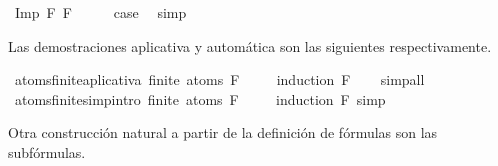 \begin{isabellebody}
\ {\isacharparenleft}Imp\ F{}\ F{}{\isacharparenright}\isanewline
\ \ \isamarkupfalse%
\ \isamarkupfalse%
\ {\isacharquery}case\ \isamarkupfalse%
\ simp\isanewline
{}\isamarkupfalse%
%
\endisatagproof
{\isafoldproof}%
%
\isadelimproof
%
\endisadelimproof
%
\begin{isamarkuptext}%
Las demostraciones aplicativa y automática son las siguientes respectivamente.%
\end{isamarkuptext}\isamarkuptrue%
\isamarkupfalse%
\ atoms{\isacharunderscore}finite{\isacharunderscore}aplicativa{\isacharcolon}\ {\isachardoublequoteopen}finite\ {\isacharparenleft}atoms\ F{\isacharparenright}{\isachardoublequoteclose}\ \isanewline
%
\isadelimproof
\ \ %
\endisadelimproof
%
\isatagproof
{}\isamarkupfalse%
\ {\isacharparenleft}induction\ F{\isacharparenright}\isanewline
\ \ \isamarkupfalse%
\ simp{\isacharunderscore}all\isanewline
\ \isamarkupfalse%
%
\endisatagproof
{\isafoldproof}%
%
\isadelimproof
\isanewline
%
\endisadelimproof
\isanewline
{}\isamarkupfalse%
\ atoms{\isacharunderscore}finite{\isacharbrackleft}simp{\isacharcomma}intro{\isacharbang}{\isacharbrackright}{\isacharcolon}\ {\isachardoublequoteopen}finite\ {\isacharparenleft}atoms\ F{\isacharparenright}{\isachardoublequoteclose}\ \isanewline
%
\isadelimproof
\ \ %
\endisadelimproof
%
\isatagproof
{}\isamarkupfalse%
\ {\isacharparenleft}induction\ F{\isacharsemicolon}\ simp{\isacharparenright}%
\endisatagproof
{\isafoldproof}%
%
\isadelimproof
%
\endisadelimproof
%
\isadelimdocument
%
\endisadelimdocument
%
\isatagdocument
%
\isamarkuptrue%
%
\endisatagdocument
{\isafolddocument}%
%
\isadelimdocument
%
\endisadelimdocument
%
\begin{isamarkuptext}%
Otra construcción natural a partir de la definición de fórmulas son las subfórmulas.


\end{isamarkuptext}
\end{isabellebody}
